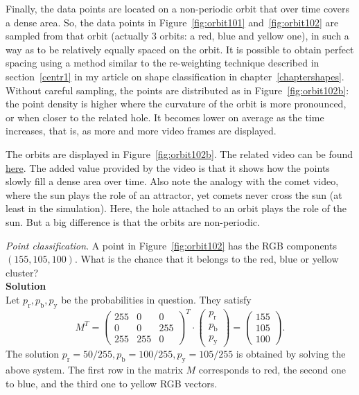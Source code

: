 \documentclass[oneside,10pt]{book}
\newcommand{\qed}{\nobreak \ifvmode \relax \else
      \ifdim\lastskip<1.5em \hskip-\lastskip
      \hskip1.5em plus0em minus0.5em \fi \nobreak
      \vrule height0.75em width0.5em depth0.25em\fi}
\begin{document}
Finally, the data points are located on a non-periodic orbit that over time covers a dense area. So, the data points in Figure~\ref{fig:orbit101} 
and~\ref{fig:orbit102} are sampled from that orbit (actually 3 orbits: a red, blue and yellow one), in such a way as to be relatively equally spaced on the orbit. 
It is possible to obtain perfect spacing using a method similar to the re-weighting technique described in section~\ref{centr1}  in my article on shape classification in chapter~\ref{chaptershapes}. Without careful sampling, the points are distributed as in Figure~\ref{fig:orbit102b}: the point density is higher where the curvature of the orbit is more pronounced, or when closer to the related hole. It becomes lower on average as the time increases, that is, as more and more video frames are displayed.

The orbits are displayed in Figure~\ref{fig:orbit102b}. The related video can be found \href{https://www.youtube.com/watch?v=aub5am1YjIs}{here}. The added value provided by the video is that it shows how the points slowly fill a dense area over time. Also note the analogy with the comet video, where the sun plays the role of an attractor, yet comets never cross the sun (at least in the simulation). Here, the hole attached to an orbit plays the role of the sun. 
But a big difference is that the orbits are non-periodic. 


\begin{Exercise}\label{exqwas}{\em Point classification}. A point in Figure~\ref{fig:orbit102} has the RGB components $(155,105,100)$. What is the 
chance that it belongs to the red, blue or yellow cluster? \vspace{1ex} \\
{\bf Solution} \vspace{1ex} \\
Let $p_\text{r},p_\text{b},p_\text{y}$ be the probabilities in question. They satisfy
$$M^T=
\left(
\begin{array}{rrr}
 255 & 0 & 0 \\
 0 & 0 & 255 \\
 255 & 255 & 0 
\end{array}
\right)^T \cdot
\left(
\begin{array}{r}
p_\text{r} \\
p_\text{b} \\
p_\text{y}
\end{array}
\right)=
\left(
\begin{array}{r}
155 \\
105 \\
100
\end{array}
\right).
$$
The solution $p_\text{r}=50/255,p_\text{b}=100/255,p_\text{y}=105/255$ is obtained by solving the above system. The first row in the matrix $M$ corresponds to red, the second one to blue, and the third one to yellow RGB vectors. \qed
\end{Exercise}
\end{document}

